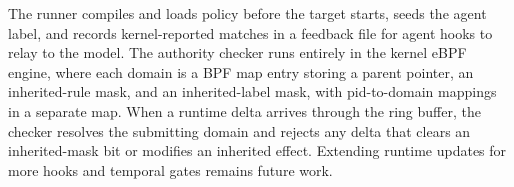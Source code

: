The runner compiles and loads policy before the target starts, seeds the agent label, and records kernel-reported matches in a feedback file for agent hooks to relay to the model.
The authority checker runs entirely in the kernel eBPF engine, where each domain is a BPF map entry storing a parent pointer, an inherited-rule mask, and an inherited-label mask, with pid-to-domain mappings in a separate map.
When a runtime delta arrives through the ring buffer, the checker resolves the submitting domain and rejects any delta that clears an inherited-mask bit or modifies an inherited effect.
Extending runtime updates for more hooks and temporal gates remains future work.
